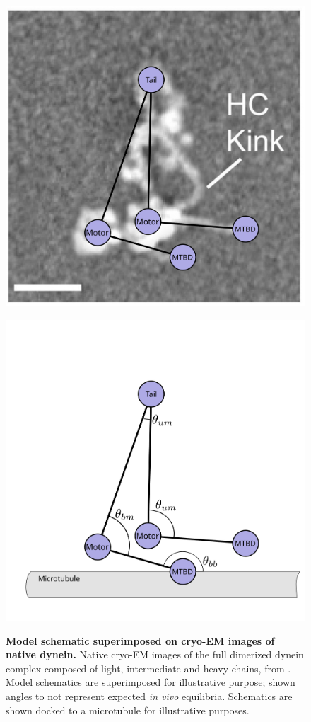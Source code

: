 \documentclass[9pt,twocolumn,twoside,lineno]{pnas-new}
\begin{document}
\begin{figure}
\begin{minipage}{.3\textwidth}
   \label{fig:modlengths}
 \end{minipage}%
 \begin{minipage}{.3\textwidth}
   \centering
   \includegraphics[width=0.5\linewidth]{figures/schematic-2-superimposed}
   \label{fig:modlengths}
 \end{minipage}%
 \begin{minipage}{.3\textwidth}
   \centering
   \includegraphics[width=0.5\linewidth]{figures/schematic-2-model}
   \label{fig:explengths}
 \end{minipage}
\caption{\textbf{Model schematic superimposed on cryo-EM images of native dynein.} Native cryo-EM images of the full dimerized dynein complex composed of light, intermediate and heavy chains, from \cite{nativestructure}. Model schematics are superimposed for illustrative purpose; shown angles to not represent expected \textit{in vivo} equilibria. Schematics are shown docked to a microtubule for illustrative purposes.}
\label{fig:modelparams}
\end{figure}
\end{document}

